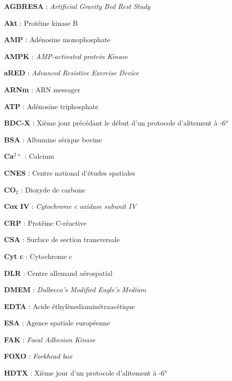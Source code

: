 \documentclass[11pt]{report}
\begin{document}
{\setlength{\parindent}{0pt}
	\noindent
	\begin{minipage}[t]{0.45\textwidth}
		
		\textbf{AGBRESA} : \textit{Artificial Gravity Bed Rest Study}
		
		\textbf{Akt} : Protéine kinase B
		
		\textbf{AMP} : Adénosine monophosphate
		
		\textbf{AMPK} : \textit{AMP-activated protein Kinase}
		
		\textbf{aRED} : \textit{Advanced Resistive Exercise Device}
		
		\textbf{ARNm} : ARN messager
		
		\textbf{ATP} : Adénosine triphosphate
		
		\bigskip
		
		\textbf{BDC-X} : Xième jour précédant le début d'un protocole d'alitement à -6°
		
		\textbf{BSA} : Albumine sérique bovine
		
		\bigskip
		
		\textbf{Ca$^{2+}$} : Calcium
		
		\textbf{CNES} : Centre national d'études spatiales
		
		\textbf{CO$_2$} : Dioxyde de carbone
		
		\textbf{Cox IV} : \textit{Cytochrome c oxidase subunit IV}
		
		\textbf{CRP} : Protéine C-réactive
		
		\textbf{CSA} : Surface de section transversale
		
		\textbf{Cyt c} : Cytochrome c
		
		\bigskip
		
		\textbf{DLR} : Centre allemand aérospatial
		
		\textbf{DMEM} : \textit{Dulbecco's Modified Eagle's Medium}
		
		\bigskip
		
		\textbf{EDTA} : Acide éthylènediaminétraacétique
		
		\textbf{ESA} : Agence spatiale européenne
		
		\bigskip
		
		\textbf{FAK} : \textit{Focal Adhesion Kinase}
		
		\textbf{FOXO} : \textit{Forkhead box}
		
		\bigskip
		
		\textbf{HDTX} : Xième jour d'un protocole d'alitement à -6°
		
		\bigskip
		

\end{minipage}}
\end{document}
